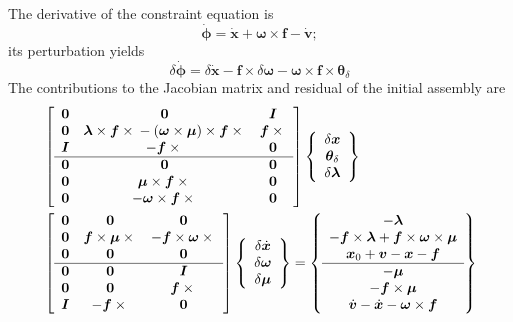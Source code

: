 \documentclass[10pt,fleqn,subeqn]{report}
\newcommand{\T}[1]{\bm{#1}}
\begin{document}
The derivative of the constraint equation is
\begin{equation}
	\dot{\T{\phi}}
	= \dot{\T{x}}
	+ \T{\omega}\times\T{f}
	- \dot{\T{v}} ;
\end{equation}
its perturbation yields
\begin{equation}
	\delta\dot{\T{\phi}}
	= \delta\dot{\T{x}}
	- \T{f}\times\delta\T{\omega}
	- \T{\omega}\times\T{f}\times\T{\theta}_{\delta}
\end{equation}
The contributions to the Jacobian matrix and residual 
of the initial assembly are
\begin{align}
	& \sqbr{\matr{ccc}{
		\T{0} & \T{0} & \T{I} \\				%
		\T{0} & \T{\lambda}\times\T{f}\times{}
			- \plbr{\T{\omega}\times\T{\mu}}\times\T{f}\times{} &
			\T{f}\times{} \\				%
		\T{I} & -\T{f}\times{} & \T{0} \\			%
%
	\hline
		\T{0} & \T{0} & \T{0} \\				%
		\T{0} & \T{\mu}\times\T{f}\times{} & \T{0} \\		%
		\T{0} & -\T{\omega}\times\T{f}\times{} & \T{0}		%
	}} \cubr{\cvvect{
		\delta\T{x} \\
		\T{\theta}_{\delta} \\
		\delta\T{\lambda}
	}} \nonumber \\
	& \sqbr{\matr{ccc}{
		\T{0} & \T{0} & \T{0} \\				%
		\T{0} & \T{f}\times\T{\mu}\times{} &
			-\T{f}\times\T{\omega}\times{} \\		%
		\T{0} & \T{0} & \T{0} \\				%
%
	\hline
		\T{0} & \T{0} & \T{I} \\				%
		\T{0} & \T{0} & \T{f}\times{} \\			%
		\T{I} & -\T{f}\times{} & \T{0} 				%
	}} \cubr{\cvvect{
		\delta\dot{\T{x}} \\
		\delta\T{\omega} \\
		\delta\T{\mu}
	}} %
	= \cubr{\cvvect{
		- \T{\lambda} \\
		- \T{f}\times\T{\lambda}
			+ \T{f}\times\T{\omega}\times\T{\mu} \\
		\T{x}_0 + \T{v} - \T{x} - \T{f} \\
%
	\hline
		- \T{\mu} \\
		- \T{f}\times\T{\mu} \\
		\dot{\T{v}} - \dot{\T{x}} - \T{\omega}\times\T{f}
	}}
\end{align}
\end{document}
